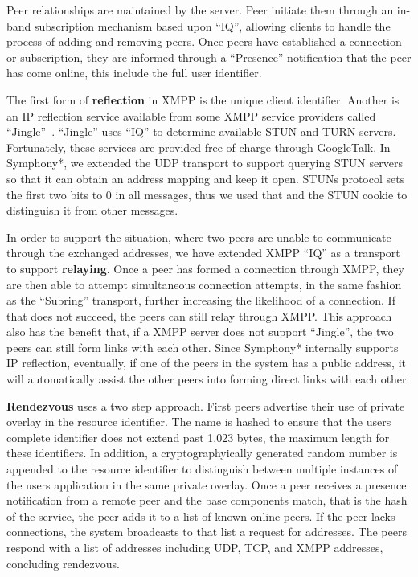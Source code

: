 \documentclass[conference]{IEEEtran}
\begin{document}
Peer relationships are maintained by the server.  Peer initiate them through an
in-band subscription mechanism based upon ``IQ'', allowing clients to handle
the process of adding and removing peers.  Once peers have established a
connection or subscription, they are informed through a ``Presence''
notification that the peer has come online, this include the full user
identifier.

The first form of \textbf{reflection} in XMPP is the unique client identifier.
Another is an IP reflection service available from some XMPP service providers
called ``Jingle''~\cite{jingle}.  ``Jingle'' uses ``IQ'' to determine available
STUN and TURN servers.  Fortunately, these services are provided free of charge
through GoogleTalk.  In Symphony*, we extended the UDP transport to support
querying STUN servers so that it can obtain an address mapping and keep it
open.  STUNs protocol sets the first two bits to 0 in all messages, thus we
used that and the STUN cookie to distinguish it from other messages.

In order to support the situation, where two peers are unable to communicate
through the exchanged addresses, we have extended XMPP ``IQ'' as a transport to
support \textbf{relaying}.  Once a peer has formed a connection through XMPP,
they are then able to attempt simultaneous connection attempts, in the same
fashion as the ``Subring'' transport, further increasing the likelihood of a
connection.  If that does not succeed, the peers can still relay through XMPP.
This approach also has the benefit that, if a XMPP server does not support
``Jingle'', the two peers can still form links with each other.  Since Symphony*
internally supports IP reflection, eventually, if one of the peers in the system
has a public address, it will automatically assist the other peers into forming
direct links with each other.

\textbf{Rendezvous} uses a two step approach.  First peers advertise their use
of private overlay in the resource identifier.  The name is hashed to ensure
that the users complete identifier does not extend past 1,023 bytes, the
maximum length for these identifiers.  In addition, a cryptographyically
generated random number is appended to the resource identifier to distinguish
between multiple instances of the users application in the same private
overlay.  Once a peer receives a presence notification from a remote peer and
the base components match, that is the hash of the service, the peer adds it to
a list of known online peers.  If the peer lacks connections, the system
broadcasts to that list a request for addresses.  The peers respond with a list
of addresses including UDP, TCP, and XMPP addresses, concluding rendezvous.
\end{document}
